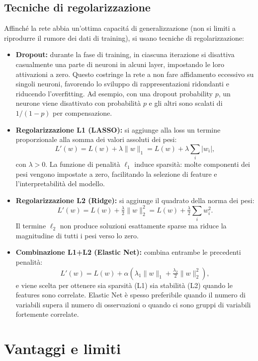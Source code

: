 \documentclass[a4paper,12pt]{report}
\begin{document}
	\subsection{Tecniche di regolarizzazione}
	Affinché la rete abbia un'ottima capacit\'a di generalizzazione (non si limiti a riprodurre il rumore dei dati di training), si usano tecniche di regolarizzazione:
	\begin{itemize}
		\item \textbf{Dropout:} durante la fase di training, in ciascuna iterazione si disattiva casualmente una parte di neuroni in alcuni layer, impostando le loro attivazioni a zero. Questo costringe la rete a non fare affidamento eccessivo su singoli neuroni, favorendo lo sviluppo di rappresentazioni ridondanti e riducendo l'overfitting. Ad esempio, con una dropout probability \(p\), un neurone viene disattivato con probabilità \(p\) e gli altri sono scalati di \(1/(1-p)\) per compensazione.
		\item \textbf{Regolarizzazione L1 (LASSO):} si aggiunge alla loss un termine proporzionale alla somma dei valori assoluti dei pesi:
		\[
		L'(w)=L(w) + \lambda \|w\|_1 = L(w) + \lambda\sum_i |w_i|,
		\]
		con \(\lambda>0\). La funzione di penalità \(\ell_1\) induce sparsit\`a: molte componenti dei pesi vengono impostate a zero, facilitando la selezione di feature e l'interpretabilità del modello.
		\item \textbf{Regolarizzazione L2 (Ridge):} si aggiunge il quadrato della norma dei pesi:
		\[
		L'(w)=L(w) + \tfrac{\lambda}{2}\|w\|_2^2 = L(w) + \tfrac{\lambda}{2}\sum_i w_i^2.
		\]
		Il termine \(\ell_2\) non produce soluzioni esattamente sparse ma riduce la magnitudine di tutti i pesi verso lo zero.
		\item \textbf{Combinazione L1+L2 (Elastic Net):} combina entrambe le precedenti penalità:
		\[
		L'(w)=L(w) + \alpha\left(\lambda_1\|w\|_1 + \tfrac{\lambda_2}{2}\|w\|_2^2\right),
		\]
		e viene scelta per ottenere sia sparsit\`a (L1) sia stabilit\`a (L2) quando le features sono correlate. Elastic Net \`e spesso preferibile quando il numero di variabili supera il numero di osservazioni o quando ci sono gruppi di variabili fortemente correlate.
	\end{itemize}
	
	\section{Vantaggi e limiti}
	
\end{document}
